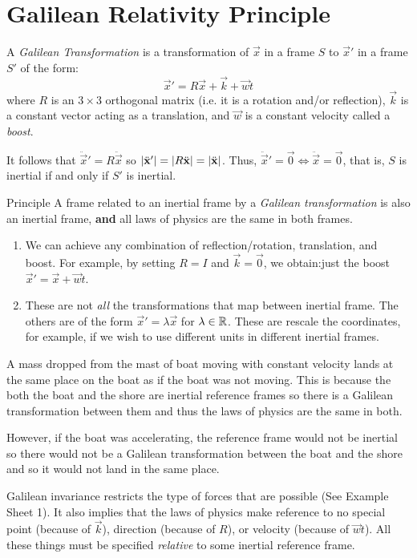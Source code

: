 \documentclass[../main.tex]{subfiles}
\begin{document}
\section{Galilean Relativity Principle}
\label{galileanRelativity}
\begin{definition}
  A \textit{Galilean Transformation} is a transformation of $\vec{x}$ in a frame $S$ to $\vec{x}'$ in a frame $S'$ of the form:
  \[
    \vec{x}' = R\vec{x} + \vec{k} + \vec{w}t
  \]
  where $R$ is an $3 \times 3$ orthogonal matrix (i.e. it is a rotation and/or reflection), $\vec{k}$ is a constant vector acting as a translation, and $\vec{w}$ is a constant velocity called a \textit{boost}.
\end{definition}
It follows that $\ddot{\vec{x}}' = R\ddot{\vec{x}}$ so $\left\lvert \ddot{\mathbf{\bm{x}}}' \right\rvert = \left\lvert R\ddot{\mathbf{\bm{x}}} \right\rvert = \left\lvert \ddot{\mathbf{\bm{x}}} \right\rvert$.
Thus, $\ddot{\vec{x}}' = \vec{0} \iff \ddot{\vec{x}} = \vec{0}$, that is, $S$ is inertial if and only if $S'$ is inertial.
\begin{theoremlike}{Principle}
  A frame related to an inertial frame by a \textit{Galilean transformation} is also an inertial frame, \textbf{and} all laws of physics are the same in both frames.
\end{theoremlike}
\begin{remark}[Remarks]
  \begin{enumerate}
    \item We can achieve any combination of reflection/rotation, translation, and boost.
      For example, by setting $R = I$ and $\vec{k} = \vec{0}$, we obtain:just the boost $\vec{x}' = \vec{x} + \vec{w}t$.
    \item These are not \textit{all} the transformations that map between inertial frame.
      The others are of the form $\vec{x}' = \lambda\vec{x}$ for $\lambda \in \mathbb{R}$.
      These are rescale the coordinates, for example, if we wish to use different units in different inertial frames.
  \end{enumerate}
\end{remark}
\begin{example}
  A mass dropped from the mast of boat moving with constant velocity lands at the same place on the boat as if the boat was not moving.
  This is because the both the boat and the shore are inertial reference frames so there is a Galilean transformation between them and thus the laws of physics are the same in both.

  However, if the boat was accelerating, the reference frame would not be inertial so there would not be a Galilean transformation between the boat and the shore and so it would not land in the same place.
\end{example}
Galilean invariance restricts the type of forces that are possible (See Example Sheet 1).
It also implies that the laws of physics make reference to no special point (because of $\vec{k}$), direction (because of $R$), or velocity (because of $\vec{w}t$).
All these things must be specified \textit{relative} to some inertial reference frame.
\end{document}

